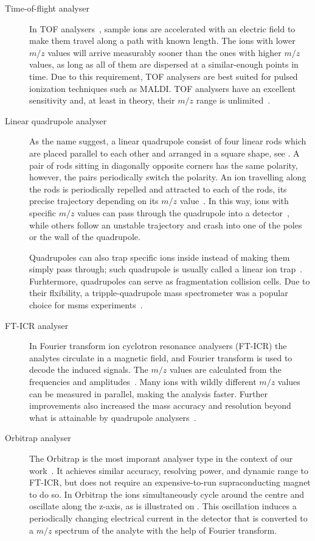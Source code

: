\begin{description}
  \item[Time-of-flight analyser] In TOF analysers~\cite{stephens1946pulsed}, sample ions are accelerated with an electric field to make them travel along a path with known length. The ions with lower \(m/z\) values will arrive measurably sooner than the ones with higher \(m/z\) values, as long as all of them are dispersed at a similar-enough points in time. Due to this requirement, TOF analysers are best suited for pulsed ionization techniques such as MALDI\@. TOF analysers have an excellent sensitivity and, at least in theory, their \(m/z\) range is unlimited~\cite{fuerstenau1995molecular}.
  \item[Linear quadrupole analyser] As the name suggest, a linear quadrupole consist of four linear rods which are placed parallel to each other and arranged in a square shape, see . A pair of rods sitting in diagonally opposite corners has the same polarity, however, the pairs periodically switch the polarity. An ion travelling along the rods is periodically repelled and attracted to each of the rods, its precise trajectory depending on its \(m/z\) value~\cite{paul1990electromagnetic}. In this way, ions with specific \(m/z\) values can pass through the quadrupole into a detector~\cite{paul1953neues}, while others follow an unstable trajectory and crash into one of the poles or the wall of the quadrupole.

    Quadrupoles can also trap specific ions inside instead of making them simply pass through; such quadrupole is usually called a linear ion trap~\cite{mao2003h}. Furhtermore, quadrupoles can serve as fragmentation collision cells. Due to their flxibility, a tripple-quadrupole mass spectrometer was a popular choice for \gls*{msms} experiments~\cite{yost1978selected}.
  \item[FT-ICR analyser] In Fourier transform ion cyclotron resonance analysers (FT-ICR) the analytes circulate in a magnetic field, and Fourier transform is used to decode the induced signals. The \(m/z\) values are calculated from the frequencies and amplitudes~\cite{comisarow1974fourier}. Many ions with wildly different \(m/z\) values can be measured in parallel, making the analysis faster. Further improvements also increased the mass accuracy and resolution beyond what is attainable by quadrupole analysers~\cite{amster1996fourier, easterling1999routine}.
  \item[Orbitrap analyser] The Orbitrap is the most imporant analyser type in the context of our work~\cite{hu2005orbitrap}. It achieves similar accuracy, resolving power, and dynamic range to FT-ICR, but does not require an expensive-to-run supraconducting magnet to do so. In Orbitrap the ions simultaneously cycle around the centre and oscillate along the z-axis, as is illustrated on . This oscillation induces a periodically changing electrical current in the detector that is converted to a \(m/z\) spectrum of the analyte with the help of Fourier transform.


\end{description}
